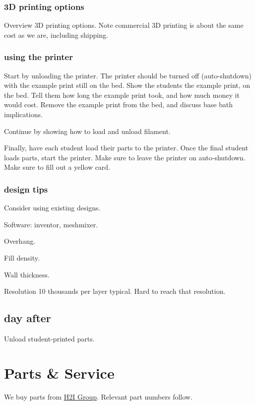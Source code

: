 \documentclass{training}
\begin{document}
\subsubsection{3D printing options}

Overview 3D printing options.
Note commercial 3D printing is about the same cost as we are, including shipping.

\subsubsection{using the printer}

Start by unloading the printer.
The printer should be turned off (auto-shutdown) with the example print still on the bed.
Show the students the example print, on the bed.
Tell them how long the example print took, and how much money it would cost.
Remove the example print from the bed, and discuss base bath implications.

Continue by showing how to load and unload filament.

Finally, have each student load their parts to the printer.
Once the final student loads parts, start the printer.
Make sure to leave the printer on auto-shutdown.
Make sure to fill out a yellow card.

\subsubsection{design tips}

Consider using existing designs.

Software: inventor, meshmixer.

Overhang.

Fill density.

Wall thickness.

Resolution 10 thousands per layer typical. Hard to reach that resolution.

\subsection{day after}

Unload student-printed parts.

\clearpage
\section{Parts \& Service}

We buy parts from \href{https://www.shop.h2igroup.com/}{H2I Group}.
Relevant part numbers follow.
\end{document}
